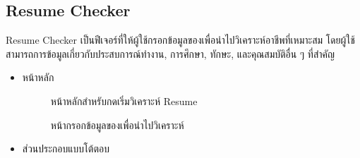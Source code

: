 \subsection {Resume Checker}
\label{subsec:ResumeChecker}
Resume Checker เป็นฟีเจอร์ที่ให้ผู้ใช้กรอกข้อมูลของเพื่อนำไปวิเคราะห์อาชีพที่เหมาะสม โดยผู้ใช้สามารถการข้อมูลเกี่ยวกับประสบการณ์ทำงาน, การศึกษา, ทักษะ, และคุณสมบัติอื่น ๆ ที่สำคัญ
\begin{itemize}
    \item หน้าหลัก
          \begin{figure}[H]\centering
              \setlength{\fboxrule}{0.2mm} %
              \setlength{\fboxsep}{0.5cm}
              \caption{\centering หน้าหลักสำหรับกดเริ่มวิเคราะห์ Resume}\label{fig:wireframe1_1}
          \end{figure}
          \begin{figure}[H]\centering
              \setlength{\fboxrule}{0.2mm} %
              \setlength{\fboxsep}{0.5cm}
              \caption{\centering หน้ากรอกข้อมูลของเพื่อนำไปวิเคราะห์}\label{fig:wireframe1_2}
          \end{figure}
    \item ส่วนประกอบแบบโต้ตอบ
          \begin{figure}[H]\centering

\end{figure}
\end{itemize}
